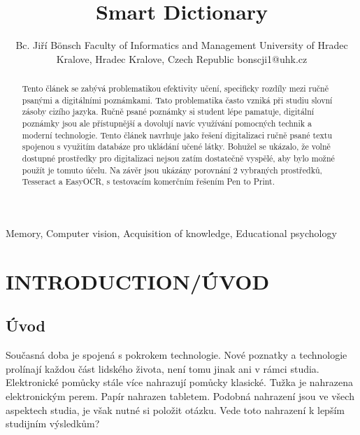\documentclass[journal]{IEEEtran}
\title{Smart Dictionary}
\author{Bc. Jiří Bönsch
        \linebreak
        Faculty of Informatics and Management
        \linebreak
        University of Hradec Kralove,
        \linebreak
        Hradec Kralove, Czech Republic
        \linebreak
        bonscji1@uhk.cz

}
\begin{document}
\maketitle

\begin{abstract}
        Tento článek se zabývá problematikou efektivity učení, specificky rozdíly mezi ručně psanými a digitálními poznámkami.
        Tato problematika často vzniká při studiu slovní zásoby cizího jazyka.
        Ručně psané poznámky si student lépe pamatuje, digitální poznámky jsou ale přístupnější a dovolují navíc využívání pomocných technik a moderní technologie.
        Tento článek navrhuje jako řešení digitalizaci ručně psané textu spojenou s využitím databáze pro ukládání učené látky.
        Bohužel se ukázalo, že volně dostupné prostředky pro digitalizaci nejsou zatím dostatečně vyspělé, aby bylo možné použít je tomuto účelu.
        Na závěr jsou ukázány porovnání 2 vybraných prostředků, Tesseract a EasyOCR, s testovacím komerčním řešením Pen to Print.
\end{abstract}

\begin{IEEEkeywords}
Memory, Computer vision, Acquisition of knowledge, Educational psychology
\end{IEEEkeywords}


\IEEEpeerreviewmaketitle



\section{INTRODUCTION/ÚVOD}

\subsection{Úvod}
Současná doba je spojená s pokrokem technologie.
Nové poznatky a technologie prolínají každou část lidského života, není tomu jinak ani v rámci studia.
Elektronické pomůcky stále více nahrazují pomůcky klasické.
Tužka je nahrazena elektronickým perem.
Papír nahrazen tabletem.
Podobná nahrazení jsou ve všech aspektech studia, je však nutné si položit otázku.
Vede toto nahrazení k lepším studijním výsledkům?
\end{document}

